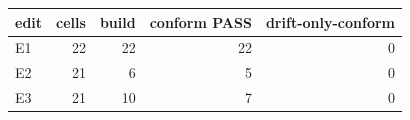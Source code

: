 \begin{tabular}{lrrrr}
\toprule
\textbf{edit} & \textbf{cells} & \textbf{build} & \textbf{conform PASS} & \textbf{drift-only-conform} \\
\midrule
E1 & 22 & 22 & 22 & 0 \\
E2 & 21 & 6 & 5 & 0 \\
E3 & 21 & 10 & 7 & 0 \\
\bottomrule
\end{tabular}
